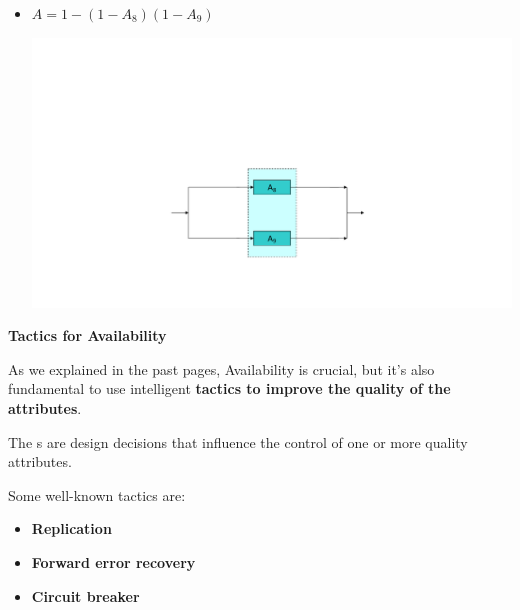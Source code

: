 \begin{examplebox}
\begin{itemize}
        \item $A = 1 - \left(1-A_{8}\right)\left(1-A_{9}\right)$
        \begin{center}
            \includegraphics[width=.8\textwidth]{img/availability-in-parallel-4.pdf}
        \end{center}
    \end{itemize}
\end{examplebox}

\newpage

\begin{flushleft}
    \textcolor{Red2}{ \textbf{Tactics for Availability}}
\end{flushleft}
As we explained in the past pages, Availability is crucial, but it's also fundamental to use intelligent \textbf{tactics to improve the quality of the attributes}.

\begin{definitionbox}
    The s are design decisions that influence the control of one or more quality attributes.
\end{definitionbox}

\noindent
Some well-known tactics are:
\begin{itemize}
    \item \textbf{Replication}
    \item \textbf{Forward error recovery}
    \item \textbf{Circuit breaker}
\end{itemize}

